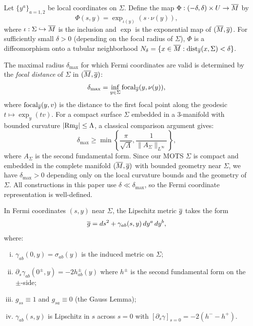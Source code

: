 \begin{definition}
Let $\{y^a\}_{a=1,2}$ be local coordinates on $\Sigma$. Define the map $\Phi: (-\delta, \delta) \times U \to \overline{M}$ by
\[
\Phi(s, y) = \exp_{\iota(y)}(s \cdot \nu(y)),
\]
where $\iota: \Sigma \hookrightarrow \overline{M}$ is the inclusion and $\exp$ is the exponential map of $(\overline{M}, \overline{g})$. For sufficiently small $\delta > 0$ (depending on the focal radius of $\Sigma$), $\Phi$ is a diffeomorphism onto a tubular neighborhood $N_\delta = \{x \in \overline{M} : \mathrm{dist}_{\overline{g}}(x, \Sigma) < \delta\}$.
\end{definition}

\begin{remark}\label{rem:InjectivityRadius}
The maximal radius $\delta_{\max}$ for which Fermi coordinates are valid is determined by the \emph{focal distance} of $\Sigma$ in $(\overline{M}, \overline{g})$:
\[
    \delta_{\max} = \inf_{y \in \Sigma} \text{focal}_{\overline{g}}(y, \nu(y)),
\]
where $\text{focal}_{\overline{g}}(y, v)$ is the distance to the first focal point along the geodesic $t \mapsto \exp_y(tv)$. For a compact surface $\Sigma$ embedded in a 3-manifold with bounded curvature $|\mathrm{Rm}_{\overline{g}}| \leq \Lambda$, a classical comparison argument gives:
\[
    \delta_{\max} \geq \min\left\{ \frac{\pi}{\sqrt{\Lambda}}, \frac{1}{\|A_\Sigma\|_{L^\infty}} \right\},
\]
where $A_\Sigma$ is the second fundamental form. Since our MOTS $\Sigma$ is compact and embedded in the complete manifold $(\overline{M}, \overline{g})$ with bounded geometry near $\Sigma$, we have $\delta_{\max} > 0$ depending only on the local curvature bounds and the geometry of $\Sigma$. All constructions in this paper use $\delta \ll \delta_{\max}$, so the Fermi coordinate representation is well-defined.
\end{remark}

\begin{lemma}
\label{lem:FermiMetricExpansion}
In Fermi coordinates $(s, y)$ near $\Sigma$, the Lipschitz metric $\overline{g}$ takes the form
\begin{equation}
\label{eq:FermiMetricForm}
\overline{g} = ds^2 + \gamma_{ab}(s, y) \, dy^a \, dy^b,
\end{equation}
where:
\begin{enumerate}[(i)]
\item $\gamma_{ab}(0, y) = \sigma_{ab}(y)$ is the induced metric on $\Sigma$;
\item $\partial_s \gamma_{ab}(0^\pm, y) = -2 h^\pm_{ab}(y)$ where $h^\pm$ is the second fundamental form on the $\pm$-side;
\item $g_{ss} \equiv 1$ and $g_{sa} \equiv 0$ (the Gauss Lemma);
\item $\gamma_{ab}(s, y)$ is Lipschitz in $s$ across $s = 0$ with $[\partial_s \gamma]_{s=0} = -2(h^- - h^+)$.
\end{enumerate}
\end{lemma}

